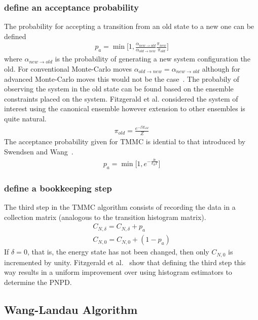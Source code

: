 \documentclass[letterpaper,twocolumn,amsmath,amssymb,pre,aps,10pt]{revtex4-1}
\begin{document}
\subsubsection{define an acceptance probability}
The probability for accepting a transition from an old state to a new one can be 
defined
\begin{align}
  p_{a} = \min\bigg[1,\frac{\alpha_{new\rightarrow old}}
  {\alpha_{old \rightarrow new}}\frac{\pi_{new}}{\pi_{old}}\bigg]
\end{align}
where $\alpha_{new\rightarrow old}$ is the probability of generating a 
new system configuration the old.  For conventional Monte-Carlo moves 
$\alpha_{old \rightarrow new} =\alpha_{new\rightarrow old}$ although 
for advanced Monte-Carlo moves this would not be the 
case~\cite{paluch2008comparing, siepmann1990method}.  The probabily of 
observing the system in the old state can be found based on the 
ensemble constraints placed on the system.  Fitzgerald et al. 
considered the system of interest using the canonical ensemble however extension to other ensembles is quite natural.  
\begin{align}
  \pi_{old} = \frac{e^{-\beta E_{old}}}{Z}
\end{align}
The acceptance probability given for TMMC is idential to that introduced by 
Swendsen and Wang~\cite{wang2002transition}.
\begin{align}
  p_{a} = \min\bigg[1,e^{-\frac{\delta\epsilon}{k_{B} T}}\bigg]
\end{align}
\subsubsection{define a bookkeeping step}
The third step in the TMMC algorithm consists of recording the data in a collection 
matrix (analogous to the transition histogram matrix).
\begin{align}
  C_{N,\delta} = C_{N,\delta} + p_{a}\\
  C_{N,0} = C_{N,0} +(1 - p_{a})
\end{align}  
If $\delta=0$, that is, the energy state has not been changed, then only 
$C_{N,0}$ is incremented by unity. Fitzgerald et al.~\cite{fitzgerald2000monte}
show that defining the third step this way results in a uniform improvement over 
using histogram estimators to determine the PNPD.




\subsection{Wang-Landau Algorithm}
\end{document}

